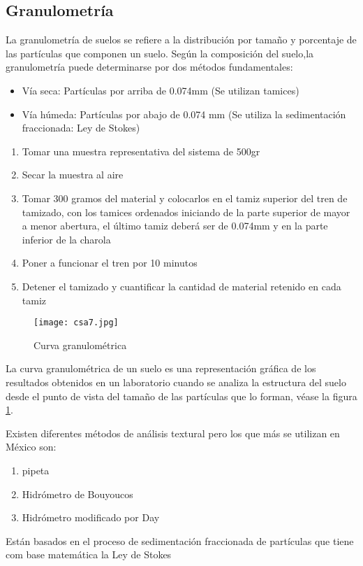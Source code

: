 \subsection{Granulometría}
La granulometría de suelos se refiere a la distribución por tamaño y porcentaje de las partículas que componen un suelo. Según la composición del suelo,la granulometría puede determinarse por dos métodos fundamentales:
\begin{itemize}
    \item Vía seca: Partículas por arriba de 0.074mm (Se utilizan tamices)
    \item Vía húmeda: Partículas por abajo de 0.074 mm (Se utiliza la sedimentación fraccionada: Ley de Stokes)
\end{itemize}
\begin{enumerate}
    \item Tomar una muestra representativa del sistema de 500gr
    \item Secar la muestra al aire
    \item Tomar 300 gramos del material y colocarlos en el tamiz superior del tren de tamizado, con los tamices ordenados iniciando de la parte superior de mayor a menor abertura, el último tamiz deberá ser de 0.074mm y en la parte inferior de la charola
    \item Poner a funcionar el tren por 10 minutos
    \item Detener el tamizado y cuantificar la cantidad de material retenido en cada tamiz
\end{enumerate}
\begin{figure}[h!]
\centering
  \texttt{[image: csa7.jpg]}
  \caption{Curva granulométrica}
  \label{csa7}
\end{figure}
La curva granulométrica de un suelo es una representación gráfica de los resultados obtenidos en un laboratorio cuando se analiza la estructura del suelo desde el punto de vista del tamaño de las partículas que lo forman, véase la figura \ref{csa7}.

Existen diferentes métodos de análisis textural pero los que más se utilizan en México son:
\begin{enumerate}
    \item pipeta
    \item Hidrómetro de Bouyoucos
    \item Hidrómetro modificado por Day
\end{enumerate}
Están basados en el proceso de sedimentación fraccionada de partículas que tiene com base matemática la Ley de Stokes

